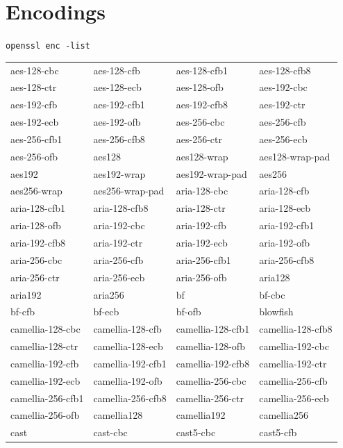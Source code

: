 \documentclass[a4paper, 12pt]{book} %
\begin{document}
\section{Encodings}

\verb|openssl enc -list|


\begin{table}[H]
\centering
\small
\begin{tabular}{llll}
\hline
aes-128-cbc & aes-128-cfb & aes-128-cfb1 & aes-128-cfb8 \\
aes-128-ctr & aes-128-ecb & aes-128-ofb & aes-192-cbc \\
aes-192-cfb & aes-192-cfb1 & aes-192-cfb8 & aes-192-ctr \\
aes-192-ecb & aes-192-ofb & aes-256-cbc & aes-256-cfb \\
aes-256-cfb1 & aes-256-cfb8 & aes-256-ctr & aes-256-ecb \\
aes-256-ofb & aes128 & aes128-wrap & aes128-wrap-pad \\
aes192 & aes192-wrap & aes192-wrap-pad & aes256 \\
aes256-wrap & aes256-wrap-pad & aria-128-cbc & aria-128-cfb \\
aria-128-cfb1 & aria-128-cfb8 & aria-128-ctr & aria-128-ecb \\
aria-128-ofb & aria-192-cbc & aria-192-cfb & aria-192-cfb1 \\
aria-192-cfb8 & aria-192-ctr & aria-192-ecb & aria-192-ofb \\
aria-256-cbc & aria-256-cfb & aria-256-cfb1 & aria-256-cfb8 \\
aria-256-ctr & aria-256-ecb & aria-256-ofb & aria128 \\
aria192 & aria256 & bf & bf-cbc \\
bf-cfb & bf-ecb & bf-ofb & blowfish \\
camellia-128-cbc & camellia-128-cfb & camellia-128-cfb1 & camellia-128-cfb8 \\
camellia-128-ctr & camellia-128-ecb & camellia-128-ofb & camellia-192-cbc \\
camellia-192-cfb & camellia-192-cfb1 & camellia-192-cfb8 & camellia-192-ctr \\
camellia-192-ecb & camellia-192-ofb & camellia-256-cbc & camellia-256-cfb \\
camellia-256-cfb1 & camellia-256-cfb8 & camellia-256-ctr & camellia-256-ecb \\
camellia-256-ofb & camellia128 & camellia192 & camellia256 \\
cast & cast-cbc & cast5-cbc & cast5-cfb \\

\end{tabular}
\end{table}
\end{document}

